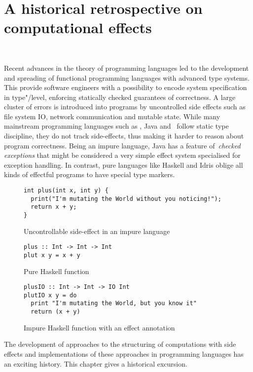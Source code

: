 \chapter{A historical retrospective on computational effects}
~\label{cpt-effects}

Recent advances in the theory of programming languages led to the development and spreading
of functional programming languages with advanced type systems. This provide
software engineers with a possibility to encode system specification in type"/level, enforcing
statically checked guarantees of correctness. A large cluster of errors is
introduced into programs by uncontrolled side effects such as file system IO,
network communication and mutable state. While many mainstream programming languages
such as \cpp, Java and \cs~follow static type discipline, they do not track
side-effects, thus making it harder to reason about program correctness. Being an impure
language, Java has a feature of~\emph{checked exceptions} that might be considered a very simple
effect system specialised for exception handling. In contrast, pure languages like Haskell and
Idris oblige all kinds of effectful programs to have special type markers.

\begin{figure}[h]
\begin {lstlisting}
int plus(int x, int y) {
  print("I'm mutating the World without you noticing!");
  return x + y;
}
\end{lstlisting}
\caption{Uncontrollable side-effect in an impure language}
\label{listing:effectfulPlus}
\end{figure}

\begin{figure}[h]
\begin{lstlisting}
plus :: Int -> Int -> Int
plut x y = x + y
\end{lstlisting}
\caption{Pure Haskell function}
\label{listing:purePlusHaskell}
\end{figure}

\begin{figure}[h]
\begin{lstlisting}
plusIO :: Int -> Int -> IO Int
plutIO x y = do
  print "I'm mutating the World, but you know it"
  return (x + y)
\end{lstlisting}
\caption{Impure Haskell function with an effect annotation}
\label{listing:purePlusHaskell}
\end{figure}

The development of approaches to the structuring of computations with side effects
and implementations of these approaches in programming languages has an exciting
history. This chapter gives a historical excursion.

